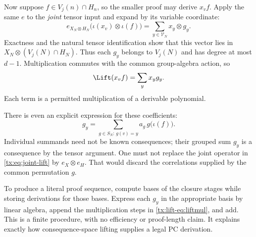 \documentclass[11pt,a4paper,oneside,openany]{book}
\theoremstyle{definition}\newtheorem{definition}[theorem]{Definition}
\theoremstyle{remark}\newtheorem{remark}[theorem]{Remark}
\numberwithin{equation}{chapter}
\begin{document}
Now suppose $f\in V_j(n)\cap H_n$, so the smaller proof may derive
$x_vf$. Apply the same $e$ to the \emph{joint} tensor input and expand
by its variable coordinate:
\begin{equation}\label{tx:eq:joint-lift}
 e_{X_N\otimes H_N}\bigl(\iota(x_v)\otimes\iota(f)\bigr)
                  =\sum_{y\in\mathcal V_N}x_y\otimes g_y.
\end{equation}
Exactness and the natural tensor identification show that this vector
lies in $X_N\otimes(V_j(N)\cap H_N)$. Thus each $g_y$ belongs to
$V_j(N)$ and has degree at most $d-1$. Multiplication commutes with
the common group-algebra action, so
\begin{equation}\label{tx:lift-eq:liftmul}
                         \Lift(x_vf)=\sum_y x_yg_y.
\end{equation}
Each term is a permitted multiplication of a derivable polynomial.

There is even an explicit expression for these coefficients:
\[
            g_y=\sum_{g\in S_N:\,g(v)=y}a_g\,g\bigl(\iota(f)\bigr).
\]
Individual summands need not be known consequences; their grouped sum
$g_y$ is a consequence by the tensor argument. One must not replace the
joint operator in \eqref{tx:eq:joint-lift} by $e_X\otimes e_H$. That would
discard the correlations supplied by the common permutation $g$.

To produce a literal proof sequence, compute bases of the closure
stages while storing derivations for those bases. Express each $g_y$ in
the appropriate basis by linear algebra, append the multiplication
steps in \eqref{tx:lift-eq:liftmul}, and add. This is a finite procedure, with
no efficiency or proof-length claim. It explains exactly how
consequence-space lifting supplies a legal PC derivation.
\end{document}
